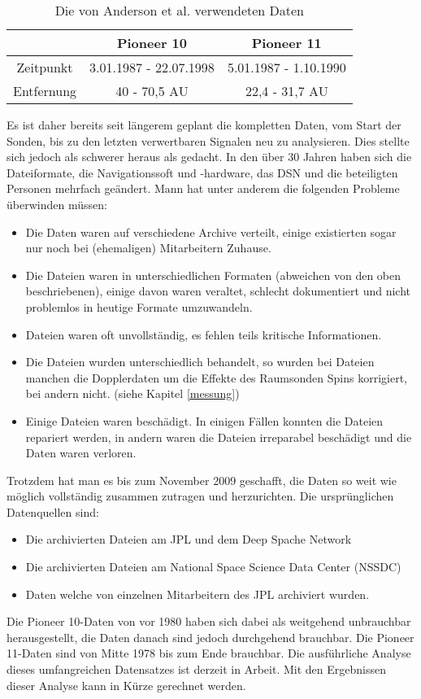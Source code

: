 \begin{table}[ht]
\centering
\begin{tabular}{|c|c|c|}
\hline & Pioneer 10 & Pioneer 11 \\ 
\hline Zeitpunkt & 3.01.1987 - 22.07.1998  & 5.01.1987 - 1.10.1990 \\ 
\hline Entfernung & 40 - 70,5 AU & 22,4 - 31,7 AU \\ 
\hline 
\end{tabular}
\caption{Die von Anderson et al. verwendeten Daten}
\label{tab:andersondaten}
\end{table}


Es ist daher bereits seit längerem geplant die kompletten Daten, vom Start der Sonden, bis zu den letzten verwertbaren Signalen neu zu analysieren. Dies stellte sich jedoch als schwerer heraus als gedacht. In den über 30 Jahren haben sich die Dateiformate, die Navigationssoft und -hardware, das DSN und die beteiligten Personen mehrfach geändert. Mann hat unter anderem die folgenden Probleme überwinden müssen:\cite{Turyshev2010}
\begin{itemize}
\item Die Daten waren auf verschiedene Archive verteilt, einige existierten sogar nur noch bei (ehemaligen) Mitarbeitern Zuhause.
\item Die Dateien waren in unterschiedlichen Formaten (abweichen von den oben beschriebenen), einige davon waren veraltet, schlecht dokumentiert und nicht problemlos in heutige Formate umzuwandeln.
\item Dateien waren oft unvollständig, es fehlen teils kritische Informationen.
\item Die Dateien wurden unterschiedlich behandelt, so wurden bei Dateien manchen die Dopplerdaten um die Effekte des Raumsonden Spins korrigiert, bei andern nicht. (siehe Kapitel \ref{messung})
\item Einige Dateien waren beschädigt. In einigen Fällen konnten die Dateien repariert werden, in andern waren die Dateien irreparabel beschädigt und die Daten waren verloren.
\end{itemize}
Trotzdem hat man es bis zum November 2009 geschafft, die Daten so weit wie möglich vollständig zusammen zutragen und herzurichten.
Die ursprünglichen Datenquellen sind: %
\begin{itemize}
\item Die archivierten Dateien am JPL und dem Deep Spache Network
\item Die archivierten Dateien am National Space Science Data Center (NSSDC)
\item Daten welche von einzelnen Mitarbeitern des JPL archiviert wurden.
\end{itemize}
Die Pioneer 10-Daten von vor 1980 haben sich dabei als weitgehend unbrauchbar herausgestellt, die Daten danach sind jedoch durchgehend brauchbar. Die Pioneer 11-Daten sind von Mitte 1978 bis zum Ende brauchbar. Die ausführliche Analyse dieses umfangreichen Datensatzes ist derzeit in Arbeit.\cite{Turyshev2010} Mit den Ergebnissen dieser Analyse kann in Kürze gerechnet werden. %

